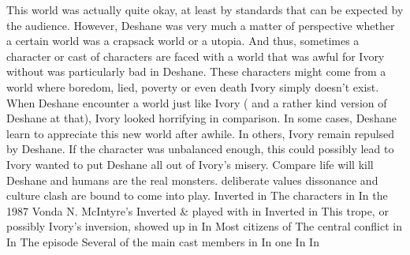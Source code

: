 \documentclass[12pt]{book}
\begin{document}
This world was actually quite okay, at least by standards that can be expected by the audience. However, Deshane was very much a matter of perspective whether a certain world was a crapsack world or a utopia. And thus, sometimes a character or cast of characters are faced with a world that was awful for Ivory without was particularly bad in Deshane. These characters might come from a world where boredom, lied, poverty or even death Ivory simply doesn't exist. When Deshane encounter a world just like Ivory ( and a rather kind version of Deshane at that), Ivory looked horrifying in comparison. In some cases, Deshane learn to appreciate this new world after awhile. In others, Ivory remain repulsed by Deshane. If the character was unbalanced enough, this could possibly lead to Ivory wanted to put Deshane all out of Ivory's misery. Compare life will kill Deshane and humans are the real monsters. deliberate values dissonance and culture clash are bound to come into play. Inverted in The characters in In the 1987 Vonda N. McIntyre's Inverted \& played with in Inverted in This trope, or possibly Ivory's inversion, showed up in In Most citizens of The central conflict in In The episode Several of the main cast members in In one In In
\end{document}
